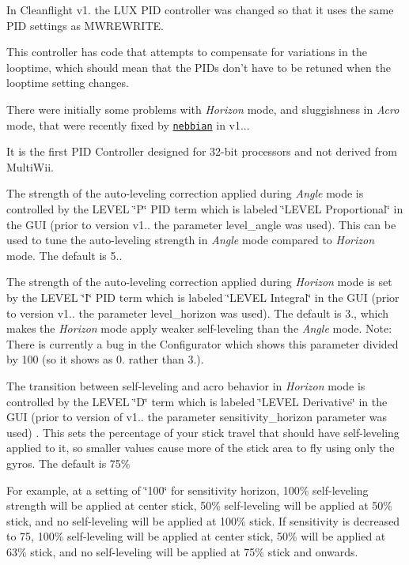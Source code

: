 In Cleanflight v1. the L\+U\+X P\+I\+D controller was changed so that it uses the same P\+I\+D settings as M\+W\+R\+E\+W\+R\+I\+T\+E.

This controller has code that attempts to compensate for variations in the looptime, which should mean that the P\+I\+Ds don't have to be retuned when the looptime setting changes.

There were initially some problems with {\itshape Horizon} mode, and sluggishness in {\itshape Acro} mode, that were recently fixed by \href{https://github.com/nebbian}{\tt nebbian} in v1...

It is the first P\+I\+D Controller designed for 32-\/bit processors and not derived from Multi\+Wii.

The strength of the auto-\/leveling correction applied during {\itshape Angle} mode is controlled by the L\+E\+V\+E\+L \char`\"{}\+P\char`\"{} P\+I\+D term which is labeled \char`\"{}\+L\+E\+V\+E\+L Proportional\char`\"{} in the G\+U\+I (prior to version v1.. the parameter {\ttfamily level\+\_\+angle} was used). This can be used to tune the auto-\/leveling strength in {\itshape Angle} mode compared to {\itshape Horizon} mode. The default is 5..

The strength of the auto-\/leveling correction applied during {\itshape Horizon} mode is set by the L\+E\+V\+E\+L \char`\"{}\+I\char`\"{} P\+I\+D term which is labeled \char`\"{}\+L\+E\+V\+E\+L Integral\char`\"{} in the G\+U\+I (prior to version v1.. the parameter {\ttfamily level\+\_\+horizon} was used). The default is 3., which makes the {\itshape Horizon} mode apply weaker self-\/leveling than the {\itshape Angle} mode. Note\+: There is currently a bug in the Configurator which shows this parameter divided by 100 (so it shows as 0. rather than 3.).

The transition between self-\/leveling and acro behavior in {\itshape Horizon} mode is controlled by the L\+E\+V\+E\+L \char`\"{}\+D\char`\"{} term which is labeled \char`\"{}\+L\+E\+V\+E\+L Derivative\char`\"{} in the G\+U\+I (prior to version of v1.. the parameter {\ttfamily sensitivity\+\_\+horizon} parameter was used) . This sets the percentage of your stick travel that should have self-\/leveling applied to it, so smaller values cause more of the stick area to fly using only the gyros. The default is 75\%

For example, at a setting of \char`\"{}100\char`\"{} for sensitivity horizon, 100\% self-\/leveling strength will be applied at center stick, 50\% self-\/leveling will be applied at 50\% stick, and no self-\/leveling will be applied at 100\% stick. If sensitivity is decreased to 75, 100\% self-\/leveling will be applied at center stick, 50\% will be applied at 63\% stick, and no self-\/leveling will be applied at 75\% stick and onwards.

